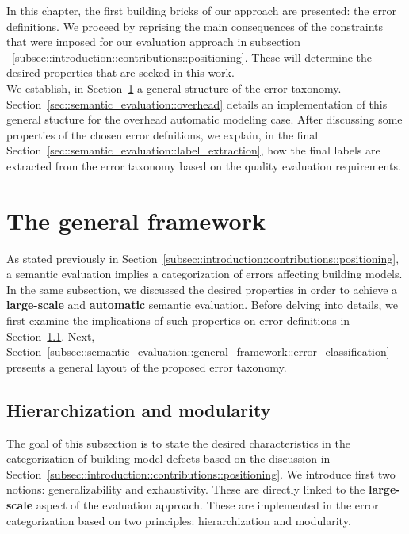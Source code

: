 \minitoc

\vfill

In this chapter, the first building bricks of our approach are presented: the error definitions.
We proceed by reprising the main consequences of the constraints that were imposed for our evaluation approach in subsection ~\ref{subsec::introduction::contributions::positioning}.
These will determine the desired properties that are seeked in this work.\\

We establish, in Section~\ref{sec::semantic_evaluation::general_framework} a general structure of the error taxonomy.
Section~\ref{sec::semantic_evaluation::overhead} details an implementation of this general stucture for the overhead automatic modeling case.
After discussing some properties of the chosen error defnitions, we explain, in the final Section~\ref{sec::semantic_evaluation::label_extraction}, how the final labels are extracted from the error taxonomy based on the quality evaluation requirements.

\clearpage

\section{The general framework}
    \label{sec::semantic_evaluation::general_framework}
    As stated previously in Section~\ref{subsec::introduction::contributions::positioning}, a semantic evaluation implies a categorization of errors affecting building models.
    In the same subsection, we discussed the desired properties in order to achieve a \textbf{large-scale} and \textbf{automatic} semantic evaluation.
    Before delving into details, we first examine the implications of such properties on error definitions in Section~\ref{subsec::semantic_evaluation::general_framework::hierarchization_moderularity}.
    Next, Section~\ref{subsec::semantic_evaluation::general_framework::error_classification} presents a general layout of the proposed error taxonomy.

    \subsection{Hierarchization and modularity}
        \label{subsec::semantic_evaluation::general_framework::hierarchization_moderularity}
        The goal of this subsection is to state the desired characteristics in the categorization of building model defects based on the discussion in Section~\ref{subsec::introduction::contributions::positioning}.
        We introduce first two notions: generalizability and exhaustivity.
        These are directly linked to the \textbf{large-scale} aspect of the evaluation approach.
        These are implemented in the error categorization based on two principles: hierarchization and modularity.


